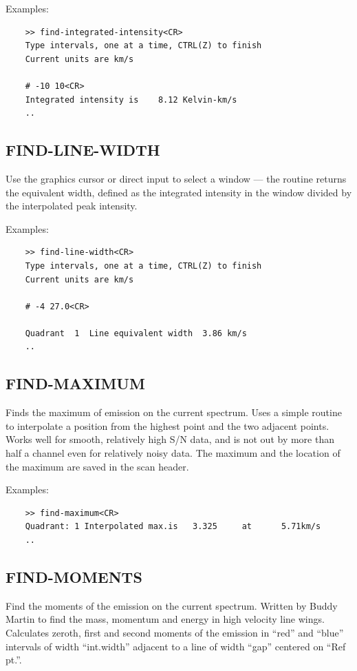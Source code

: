\documentclass[11pt,twoside]{report}
\begin{document}
Examples:
\begin{verbatim}
    >> find-integrated-intensity<CR>
    Type intervals, one at a time, CTRL(Z) to finish
    Current units are km/s  

    # -10 10<CR>
    Integrated intensity is    8.12 Kelvin-km/s  
    ..
\end{verbatim}

\subsection{FIND-LINE-WIDTH} 

Use the
graphics cursor or direct input to select a window ---
the routine returns the equivalent width, defined as the integrated
intensity in the window divided by the interpolated peak intensity.

Examples:
\begin{verbatim}
    >> find-line-width<CR>
    Type intervals, one at a time, CTRL(Z) to finish
    Current units are km/s  

    # -4 27.0<CR>

    Quadrant  1  Line equivalent width  3.86 km/s  
    ..
\end{verbatim}

\subsection{FIND-MAXIMUM} 

Finds the maximum of emission on the current spectrum. Uses a simple
routine to interpolate a position from the highest point and the two
adjacent points. Works well for smooth, relatively high S/N data, and is
not out by more than half a channel even for relatively noisy data.
The maximum and the location of the maximum are saved in the scan header.

Examples:
\begin{verbatim}
    >> find-maximum<CR>
    Quadrant: 1 Interpolated max.is   3.325     at      5.71km/s  
    ..
\end{verbatim}

\subsection{FIND-MOMENTS} 

Find the moments of the emission on the current spectrum. Written by
Buddy Martin to find the mass, momentum and energy in high velocity line
wings. Calculates zeroth, first and second moments of the emission 
in ``red'' and ``blue'' intervals of width ``int.width'' adjacent to
a line of width ``gap'' centered on ``Ref pt.''.
\end{document}

